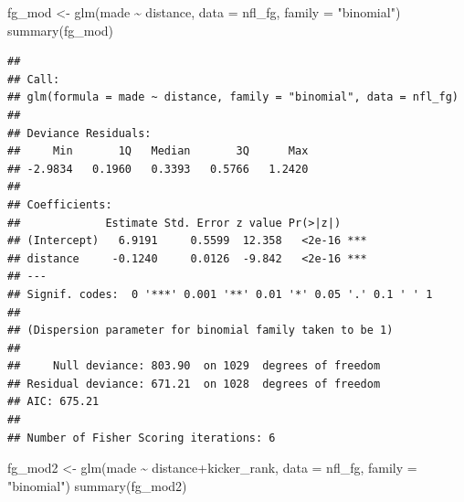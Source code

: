 \documentclass[
  11pt,
]{book}
\newenvironment{Shaded}{\begin{snugshade}}{\end{snugshade}}
\newcommand{\AttributeTok}[1]{\textcolor[rgb]{0.77,0.63,0.00}{#1}}
\newcommand{\ConstantTok}[1]{\textcolor[rgb]{0.00,0.00,0.00}{#1}}
\newcommand{\FunctionTok}[1]{\textcolor[rgb]{0.00,0.00,0.00}{#1}}
\newcommand{\NormalTok}[1]{#1}
\newcommand{\OtherTok}[1]{\textcolor[rgb]{0.56,0.35,0.01}{#1}}
\newcommand{\SpecialCharTok}[1]{\textcolor[rgb]{0.00,0.00,0.00}{#1}}
\newcommand{\StringTok}[1]{\textcolor[rgb]{0.31,0.60,0.02}{#1}}
\theoremstyle{definition}
\theoremstyle{definition}
\theoremstyle{definition}
\theoremstyle{definition}
\theoremstyle{remark}
\begin{document}
\begin{Shaded}
\end{Shaded}

\newpage

\begin{Shaded}
\begin{Highlighting}[]
\NormalTok{fg\_mod }\OtherTok{\textless{}{-}} \FunctionTok{glm}\NormalTok{(made }\SpecialCharTok{\textasciitilde{}}\NormalTok{ distance, }\AttributeTok{data =}\NormalTok{ nfl\_fg, }\AttributeTok{family =} \StringTok{"binomial"}\NormalTok{)}
\FunctionTok{summary}\NormalTok{(fg\_mod)}
\end{Highlighting}
\end{Shaded}

\begin{verbatim}
## 
## Call:
## glm(formula = made ~ distance, family = "binomial", data = nfl_fg)
## 
## Deviance Residuals: 
##     Min       1Q   Median       3Q      Max  
## -2.9834   0.1960   0.3393   0.5766   1.2420  
## 
## Coefficients:
##             Estimate Std. Error z value Pr(>|z|)    
## (Intercept)   6.9191     0.5599  12.358   <2e-16 ***
## distance     -0.1240     0.0126  -9.842   <2e-16 ***
## ---
## Signif. codes:  0 '***' 0.001 '**' 0.01 '*' 0.05 '.' 0.1 ' ' 1
## 
## (Dispersion parameter for binomial family taken to be 1)
## 
##     Null deviance: 803.90  on 1029  degrees of freedom
## Residual deviance: 671.21  on 1028  degrees of freedom
## AIC: 675.21
## 
## Number of Fisher Scoring iterations: 6
\end{verbatim}

\newpage

\begin{Shaded}
\begin{Highlighting}[]
\NormalTok{fg\_mod2 }\OtherTok{\textless{}{-}} \FunctionTok{glm}\NormalTok{(made }\SpecialCharTok{\textasciitilde{}}\NormalTok{ distance}\SpecialCharTok{+}\NormalTok{kicker\_rank, }\AttributeTok{data =}\NormalTok{ nfl\_fg, }\AttributeTok{family =} \StringTok{"binomial"}\NormalTok{)}
\FunctionTok{summary}\NormalTok{(fg\_mod2)}
\end{Highlighting}
\end{Shaded}
\end{document}
